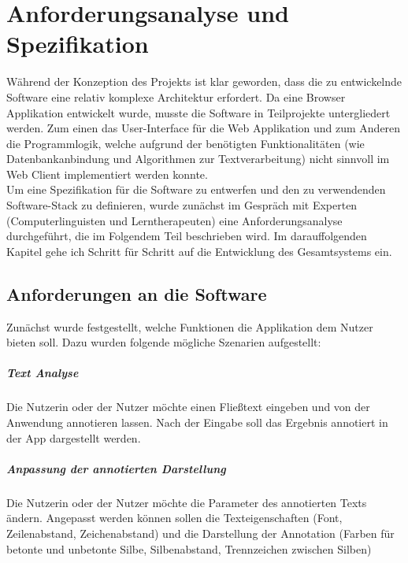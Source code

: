 
\chapter{Anforderungsanalyse und Spezifikation}
\label{sec:specification}

Während der Konzeption des Projekts ist klar geworden, dass die zu entwickelnde Software eine relativ komplexe Architektur erfordert. Da eine Browser Applikation entwickelt wurde, musste die Software in Teilprojekte untergliedert werden. Zum einen das User-Interface für die Web Applikation und zum Anderen die Programmlogik, welche aufgrund der benötigten Funktionalitäten (wie Datenbankanbindung und Algorithmen zur Textverarbeitung) nicht sinnvoll im Web Client implementiert werden konnte.\\
Um eine Spezifikation für die Software zu entwerfen und den zu verwendenden Software-Stack zu definieren, wurde zunächst im Gespräch mit Experten (Computerlinguisten und Lerntherapeuten) eine Anforderungsanalyse durchgeführt, die im Folgendem Teil beschrieben wird. Im darauffolgenden Kapitel gehe ich Schritt für Schritt auf die Entwicklung des Gesamtsystems ein.

\section{Anforderungen an die Software}

Zunächst wurde festgestellt, welche Funktionen die Applikation dem Nutzer bieten soll. Dazu wurden folgende mögliche Szenarien aufgestellt:

\paragraph{Text Analyse} 
Die Nutzerin oder der Nutzer möchte einen Fließtext eingeben und von der Anwendung annotieren lassen. Nach der Eingabe soll das Ergebnis annotiert in der App dargestellt werden.

\paragraph{Anpassung der annotierten Darstellung}
Die Nutzerin oder der Nutzer möchte die Parameter des annotierten Texts ändern. Angepasst werden können sollen die Texteigenschaften (Font, Zeilenabstand, Zeichenabstand) und die Darstellung der Annotation (Farben für betonte und unbetonte Silbe, Silbenabstand, Trennzeichen zwischen Silben)

